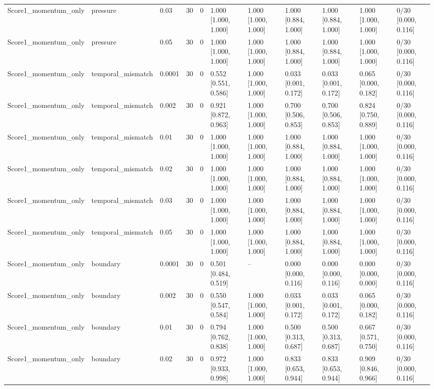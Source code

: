 \begin{longtable}{lllllllllll}
Score1\_momentum\_only & pressure & 0.03 & 30 & 0 & 1.000 [1.000, 1.000] & 1.000 [1.000, 1.000] & 1.000 [0.884, 1.000] & 1.000 [0.884, 1.000] & 1.000 [1.000, 1.000] & 0/30 [0.000, 0.116] \\
Score1\_momentum\_only & pressure & 0.05 & 30 & 0 & 1.000 [1.000, 1.000] & 1.000 [1.000, 1.000] & 1.000 [0.884, 1.000] & 1.000 [0.884, 1.000] & 1.000 [1.000, 1.000] & 0/30 [0.000, 0.116] \\
Score1\_momentum\_only & temporal\_mismatch & 0.0001 & 30 & 0 & 0.552 [0.551, 0.586] & 1.000 [1.000, 1.000] & 0.033 [0.001, 0.172] & 0.033 [0.001, 0.172] & 0.065 [0.000, 0.182] & 0/30 [0.000, 0.116] \\
Score1\_momentum\_only & temporal\_mismatch & 0.002 & 30 & 0 & 0.921 [0.872, 0.963] & 1.000 [1.000, 1.000] & 0.700 [0.506, 0.853] & 0.700 [0.506, 0.853] & 0.824 [0.750, 0.889] & 0/30 [0.000, 0.116] \\
Score1\_momentum\_only & temporal\_mismatch & 0.01 & 30 & 0 & 1.000 [1.000, 1.000] & 1.000 [1.000, 1.000] & 1.000 [0.884, 1.000] & 1.000 [0.884, 1.000] & 1.000 [1.000, 1.000] & 0/30 [0.000, 0.116] \\
Score1\_momentum\_only & temporal\_mismatch & 0.02 & 30 & 0 & 1.000 [1.000, 1.000] & 1.000 [1.000, 1.000] & 1.000 [0.884, 1.000] & 1.000 [0.884, 1.000] & 1.000 [1.000, 1.000] & 0/30 [0.000, 0.116] \\
Score1\_momentum\_only & temporal\_mismatch & 0.03 & 30 & 0 & 1.000 [1.000, 1.000] & 1.000 [1.000, 1.000] & 1.000 [0.884, 1.000] & 1.000 [0.884, 1.000] & 1.000 [1.000, 1.000] & 0/30 [0.000, 0.116] \\
Score1\_momentum\_only & temporal\_mismatch & 0.05 & 30 & 0 & 1.000 [1.000, 1.000] & 1.000 [1.000, 1.000] & 1.000 [0.884, 1.000] & 1.000 [0.884, 1.000] & 1.000 [1.000, 1.000] & 0/30 [0.000, 0.116] \\
Score1\_momentum\_only & boundary & 0.0001 & 30 & 0 & 0.501 [0.484, 0.519] & -- & 0.000 [0.000, 0.116] & 0.000 [0.000, 0.116] & 0.000 [0.000, 0.000] & 0/30 [0.000, 0.116] \\
Score1\_momentum\_only & boundary & 0.002 & 30 & 0 & 0.550 [0.547, 0.584] & 1.000 [1.000, 1.000] & 0.033 [0.001, 0.172] & 0.033 [0.001, 0.172] & 0.065 [0.000, 0.182] & 0/30 [0.000, 0.116] \\
Score1\_momentum\_only & boundary & 0.01 & 30 & 0 & 0.794 [0.762, 0.838] & 1.000 [1.000, 1.000] & 0.500 [0.313, 0.687] & 0.500 [0.313, 0.687] & 0.667 [0.571, 0.750] & 0/30 [0.000, 0.116] \\
Score1\_momentum\_only & boundary & 0.02 & 30 & 0 & 0.972 [0.933, 0.998] & 1.000 [1.000, 1.000] & 0.833 [0.653, 0.944] & 0.833 [0.653, 0.944] & 0.909 [0.846, 0.966] & 0/30 [0.000, 0.116] \\

\end{longtable}
